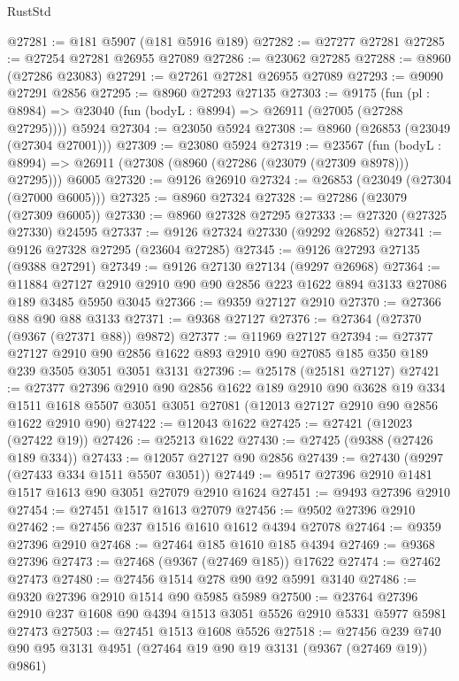 \begin{lexlean}{RustStd}
\begin{coremodule}
@27281 := @181 @5907 (@181 @5916 @189)
@27282 := @27277 @27281
@27285 := @27254 @27281 @26955 @27089
@27286 := @23062 @27285
@27288 := @8960 (@27286 @23083)
@27291 := @27261 @27281 @26955 @27089
@27293 := @9090 @27291 @2856
@27295 := @8960 @27293 @27135
@27303 := @9175
    (fun (pl : @8984) => @23040 (fun (bodyL : @8994) => @26911 (@27005 (@27288 @27295))))
    @5924
@27304 := @23050 @5924
@27308 := @8960 (@26853 (@23049 (@27304 @27001)))
@27309 := @23080 @5924
@27319 := @23567
    (fun (bodyL : @8994) => @26911 (@27308 (@8960 (@27286 (@23079 (@27309 @8978))) @27295)))
    @6005
@27320 := @9126 @26910
@27324 := @26853 (@23049 (@27304 (@27000 @6005)))
@27325 := @8960 @27324
@27328 := @27286 (@23079 (@27309 @6005))
@27330 := @8960 @27328 @27295
@27333 := @27320 (@27325 @27330) @24595
@27337 := @9126 @27324 @27330 (@9292 @26852)
@27341 := @9126 @27328 @27295 (@23604 @27285)
@27345 := @9126 @27293 @27135 (@9388 @27291)
@27349 := @9126 @27130 @27134 (@9297 @26968)
@27364 := @11884
    @27127
    @2910
    @2910
    @90
    @90
    @2856
    @223
    @1622
    @894
    @3133
    @27086
    @189
    @3485
    @5950
    @3045
@27366 := @9359 @27127 @2910
@27370 := @27366 @88 @90 @88 @3133
@27371 := @9368 @27127
@27376 := @27364 (@27370 (@9367 (@27371 @88)) @9872)
@27377 := @11969 @27127
@27394 := @27377
    @27127
    @2910
    @90
    @2856
    @1622
    @893
    @2910
    @90
    @27085
    @185
    @350
    @189
    @239
    @3505
    @3051
    @3051
    @3131
@27396 := @25178 (@25181 @27127)
@27421 := @27377
    @27396
    @2910
    @90
    @2856
    @1622
    @189
    @2910
    @90
    @3628
    @19
    @334
    @1511
    @1618
    @5507
    @3051
    @3051
    @27081
    (@12013 @27127 @2910 @90 @2856 @1622 @2910 @90)
@27422 := @12043 @1622
@27425 := @27421 (@12023 (@27422 @19))
@27426 := @25213 @1622
@27430 := @27425 (@9388 (@27426 @189 @334))
@27433 := @12057 @27127 @90 @2856
@27439 := @27430 (@9297 (@27433 @334 @1511 @5507 @3051))
@27449 := @9517 @27396 @2910 @1481 @1517 @1613 @90 @3051 @27079 @2910 @1624
@27451 := @9493 @27396 @2910
@27454 := @27451 @1517 @1613 @27079
@27456 := @9502 @27396 @2910
@27462 := @27456 @237 @1516 @1610 @1612 @4394 @27078
@27464 := @9359 @27396 @2910
@27468 := @27464 @185 @1610 @185 @4394
@27469 := @9368 @27396
@27473 := @27468 (@9367 (@27469 @185)) @17622
@27474 := @27462 @27473
@27480 := @27456 @1514 @278 @90 @92 @5991 @3140
@27486 := @9320 @27396 @2910 @1514 @90 @5985 @5989
@27500 := @23764 @27396 @2910 @237 @1608 @90 @4394 @1513 @3051 @5526 @2910 @5331 @5977 @5981 @27473
@27503 := @27451 @1513 @1608 @5526
@27518 := @27456 @239 @740 @90 @95 @3131 @4951 (@27464 @19 @90 @19 @3131 (@9367 (@27469 @19)) @9861)

\end{coremodule}
\end{lexlean}
